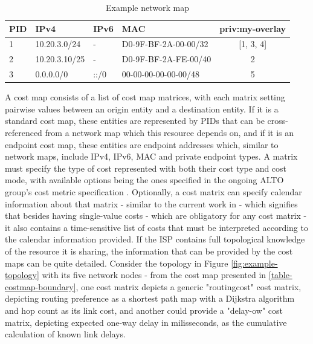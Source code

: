 \begin{table}[]
\centering
\begin{tabular}{|l|l|l|l|c|}
    \hline
PID  & IPv4          & IPv6                  & MAC                  & priv:my-overlay                     \\ \hline
1    & 10.20.3.0/24  & -                     & D0-9F-BF-2A-00-00/32 & [1, 3, 4]                           \\ \hline
2    & 10.20.3.10/25 & -                     & D0-9F-BF-2A-FE-00/40 & 2                                   \\ \hline
3    & 0.0.0.0/0     & ::/0                  & 00-00-00-00-00-00/48 & 5                                   \\ \hline
\end{tabular}
\caption{Example network map}
\label{table:networkmap-example}
\end{table}

    A cost map consists of a list of cost map matrices, with each matrix setting pairwise values between an origin entity and a destination entity.
    If it is a standard cost map, these entities are represented by PIDs that can be cross-referenced from a network map which this resource depends on, and if it is an endpoint cost map, these entities are endpoint addresses which, similar to network maps, include IPv4, IPv6, MAC and private endpoint types.
    A matrix must specify the type of cost represented with both their cost type and cost mode, with available options being the ones specified in the ongoing ALTO group's cost metric specification \cite{alto-cost-metrics(draft)}.
    Optionally, a cost matrix can specify calendar information about that matrix - similar to the current work in \cite{alto-calendar-cost-map(draft)} -  which signifies that besides having single-value costs - which are obligatory for any cost matrix - it also contains a time-sensitive list of costs that must be interpreted according to the calendar information provided.
    If the ISP contains full topological knowledge of the resource it is sharing, the information that can be provided by the cost maps can be quite detailed.
    Consider the topology in Figure \ref{fig:example-topology} with its five network nodes - from the cost map presented in \ref{table-costmap-boundary}, one cost matrix depicts a generic "routingcost" cost matrix, depicting routing preference as a shortest path map with a Dijkstra algorithm and hop count as its link cost, and another could provide a "delay-ow" cost matrix, depicting expected one-way delay in milisseconds, as the cumulative calculation of known link delays.

